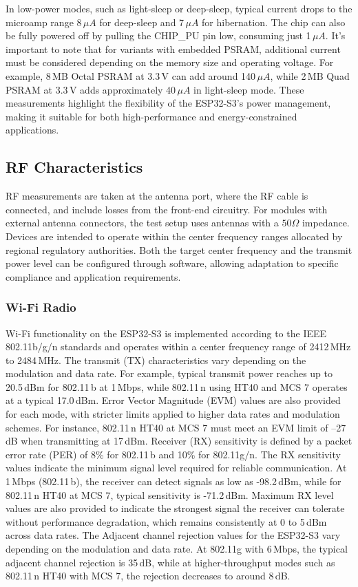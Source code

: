 In low-power modes, such as light-sleep or deep-sleep, typical current drops to the microamp range 8\,$\mu A$ for deep-sleep and 7\,$\mu A$ for hibernation. The chip can also be fully powered off by pulling the CHIP\_PU pin low, consuming just 1\,$\mu A$. It's important to note that for variants with embedded PSRAM, additional current must be considered depending on the memory size and operating voltage. For example, 8\,MB Octal PSRAM at 3.3\,V can add around 140\,$\mu A$, while 2\,MB Quad PSRAM at 3.3\,V adds approximately 40\,$\mu A$ in light-sleep mode. These measurements highlight the flexibility of the ESP32-S3’s power management, making it suitable for both high-performance and energy-constrained applications.

\subsection{RF Characteristics}
RF measurements are taken at the antenna port, where the RF cable is connected, and include losses from the front-end circuitry. For modules with external antenna connectors, the test setup uses antennas with a $50\Omega$ impedance. Devices are intended to operate within the center frequency ranges allocated by regional regulatory authorities. Both the target center frequency and the transmit power level can be configured through software, allowing adaptation to specific compliance and application requirements.

\subsubsection{Wi-Fi Radio}
Wi-Fi functionality on the ESP32-S3 is implemented according to the IEEE 802.11b/g/n standards and operates within a center frequency range of 2412\,MHz to 2484\,MHz. The transmit (TX) characteristics vary depending on the modulation and data rate. For example, typical transmit power reaches up to 20.5\,dBm for 802.11\,b at 1\,Mbps, while 802.11\,n using HT40 and MCS 7 operates at a typical 17.0\,dBm. Error Vector Magnitude (EVM) values are also provided for each mode, with stricter limits applied to higher data rates and modulation schemes. For instance, 802.11\,n HT40 at MCS 7 must meet an EVM limit of –27\,dB when transmitting at 17\,dBm. Receiver (RX) sensitivity is defined by a packet error rate (PER) of 8\% for 802.11\,b and 10\% for 802.11g/n. The RX sensitivity values indicate the minimum signal level required for reliable communication. At 1\,Mbps (802.11\,b), the receiver can detect signals as low as -98.2\,dBm, while for 802.11\,n HT40 at MCS 7, typical sensitivity is -71.2\,dBm. Maximum RX level values are also provided to indicate the strongest signal the receiver can tolerate without performance degradation, which remains consistently at 0 to 5\,dBm across data rates. The Adjacent channel rejection values for the ESP32-S3  vary depending on the modulation and data rate. At 802.11g with 6\,Mbps, the typical adjacent channel rejection is 35\,dB, while at higher-throughput modes such as 802.11\,n HT40 with MCS 7, the rejection decreases to around 8\,dB. 

